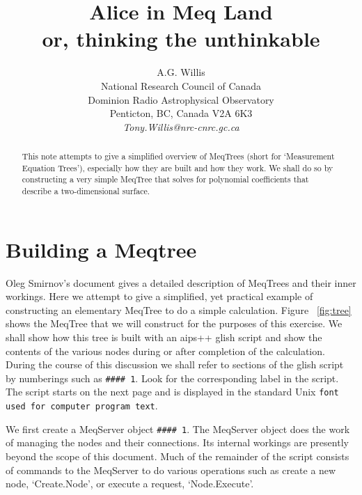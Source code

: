 \documentclass[10pt]{article}
\begin{document}
\title{Alice in Meq Land \\
or, thinking the unthinkable} 

\author{A.G. Willis\\ National Research Council of Canada\\ Dominion Radio Astrophysical Observatory\\
Penticton, BC, Canada V2A 6K3\\
\emph{Tony.Willis@nrc-cnrc.gc.ca}}          

\maketitle
\tableofcontents
\pagebreak

\begin{abstract}
This note attempts to give a simplified overview of MeqTrees (short
for `Measurement Equation Trees'), especially how they are built
and how they work. We shall do so by constructing a very simple
MeqTree that solves for polynomial coefficients that describe a 
two-dimensional surface. 
\end{abstract}

\section{Building a Meqtree}
Oleg Smirnov's \cite{smirnov} document gives a detailed description
of MeqTrees and their inner workings. Here we attempt to give a simplified,
yet practical example of constructing an elementary MeqTree to do a simple 
calculation. Figure ~\ref{fig:tree} shows the MeqTree that we will
construct for the purposes of this exercise. We shall show how this
tree is built with an aips++ glish script and show the contents of the
various nodes during or after completion of the calculation. During
the course of this discussion we shall refer to sections of the
glish script by numberings such as {\tt \#\#\#\# 1}. Look for the
corresponding label in the script. The script starts on the next page
and is displayed in the standard Unix {\tt font used for computer
program text}.

We first create a MeqServer object {\tt \#\#\#\# 1}. The MeqServer
object does the work of managing the nodes and their connections.
Its internal workings are presently beyond the scope of this document.
Much of the remainder of the script consists of commands to the
MeqServer to do various operations such as create a new node, `Create.Node',
or execute a request, `Node.Execute'.
\end{document}
